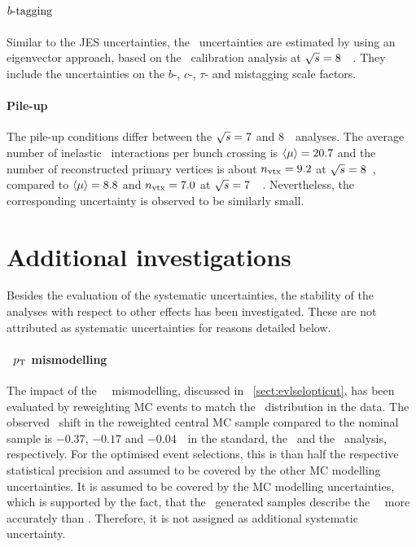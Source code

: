 \paragraph{\boldmath$b\mbox{-tagging}$}\mbox{}
%
Similar to the \gls{JES} uncertainties, the \btag\ uncertainties are estimated by using an eigenvector approach, based on the \btag\ calibration analysis at ${\sqrt{s}}=8$~\TeV~\cite{Aad:2015ydr,ATLAS-CONF-2014-004}. They include the uncertainties on the $b$-, $c$-, $\tau$- and mistagging scale factors.
%
\paragraph{Pile-up}\mbox{}
%
The pile-up conditions differ between the ${\sqrt{s}}=7$ and 8~\TeV\ analyses. The average number of inelastic \pp\ interactions per bunch crossing is $\langle\mu\rangle=20.7$ and the number of reconstructed primary vertices is about $n_\mathrm{vtx}=9.2$ at ${\sqrt{s}}=8$~\TeV, compared to $\langle\mu\rangle=8.8$ and $n_\mathrm{vtx}=7.0$ at ${\sqrt{s}}=7$~\TeV~\cite{ATLAS-CONF-2013-083}. Nevertheless, the corresponding uncertainty is observed to be similarly small.









\section{Additional investigations}
\label{sect:addinvest}
%
Besides the evaluation of the systematic uncertainties, the stability of the analyses with respect to other effects has been investigated. These are not attributed as systematic uncertainties for reasons detailed below.
%
\paragraph{\Tquark\ \boldmath$p_\mathrm{T}$ mismodelling}\mbox{}
%
The impact of the \tquark\ \pt\ mismodelling, discussed in \sect~\ref{sect:evlselopticut}, has been evaluated by reweighting \gls{MC} events to match the \ptlb\ distribution in the data. The observed \mt\ shift in the reweighted central \gls{MC} sample compared to the nominal sample is $-0.37$, $-0.17$ and $-0.04$~\GeV\ in the standard, the \cutbased\ and the \mvabased\ analysis, respectively. For the optimised event selections, this is than half the respective statistical precision and assumed to be covered by the other \gls{MC} modelling uncertainties. It is assumed to be covered by the \gls{MC} modelling uncertainties, which is supported by the fact, that the \PowhegHerwig\ generated samples describe the \tquark\ \pt\ more accurately than \PowhegPythia. Therefore, it is not assigned as additional systematic uncertainty.
%
